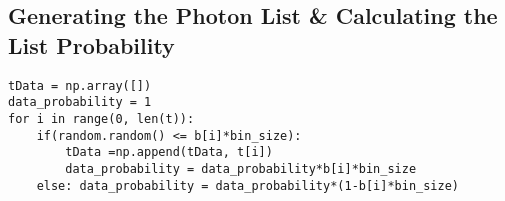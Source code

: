 \documentclass[aps,letterpaper,10pt]{revtex4}
\begin{document}
\vspace{3mm}

\subsection{Generating the Photon List \& Calculating the List Probability}

\begin{verbatim}
tData = np.array([])
data_probability = 1
for i in range(0, len(t)):
	if(random.random() <= b[i]*bin_size): 
		tData =np.append(tData, t[i])
		data_probability = data_probability*b[i]*bin_size
	else: data_probability = data_probability*(1-b[i]*bin_size)
\end{verbatim}
\end{document}
